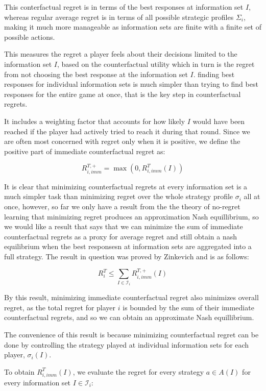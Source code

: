 \documentclass{article}
\begin{document}
This conterfactual  regret is in terms of the best responses  at information set $I$, whereas regular average regret is in terms of all possible strategic profiles $\Sigma_i$, making it much more manageable as information sets are finite with a finite set of possible actions. 

This measures the regret a player feels about their decisions limited to the information set $I$, based on the counterfactual utility which in turn is the regret from not choosing the best response at the information set $I$. finding best responses for individual information sets is much simpler than trying to find best responses for the entire game at once, that is the key step in counterfactual regrets. 

It includes a weighting factor that accounts for how likely $I$ would have been reached if the player had actively tried to reach it during that round. Since we are often most concerned with regret only when it is positive, we define the positive part of immediate counterfactual regret as:

\[ R_{i,imm}^{T,+} = \max(0, R_{i,imm}^T(I)) \]


It is clear that minimizing counterfactual regrets at every information set is a much simpler task than minimizing regret over the whole strategy profile $\sigma_i$ all at once, however, so far we only have a result from the the theory of no-regret learning that minimizing regret produces an approximation Nash equillibrium, so we would like a result that says that we can minimize the sum of immediate counterfactual regrets as a proxy for average regret and still obtain a nash equilibrium when the best responsesn at information sets are aggregated into a full strategy. The result in question was proved by Zinkevich and is as follows:

\[ R^T_i \leq \sum_{I \in \mathcal{I}_i} R_{i,imm}^{T,+}(I) \]

By this result, minimizing immediate counterfactual regret also minimizes overall regret, as the total regret for player $i$ is bounded by the sum of their immediate counterfactual regrets, and so we can obtain an approximate Nash equillibrium. 

The convenience of this result is because minimizing counterfactual regret can be done by controlling the strategy played at individual information sets for each player, $\sigma_i(I)$. 

To obtain $R_{i, imm}^T(I)$, we evaluate the regret for every strategy $a \in A(I)$ for every information set $I \in \mathcal{I}_i$:
\end{document}
